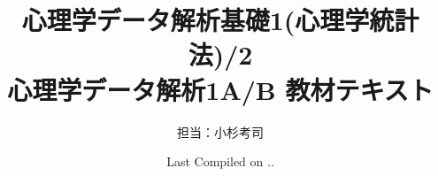 \documentclass{book}
\begin{document}
\VerbatimFootnotes
\title{心理学データ解析基礎1(心理学統計法)/2\\心理学データ解析1A/B 教材テキスト}
\author{担当：小杉考司}
\date{Last Compiled on \number\year .\number\month .\number\day}
\maketitle
\setcounter{tocdepth}{1}
\tableofcontents
\linenumbers

\nolinenumbers
{}


\printindex
\end{document}
